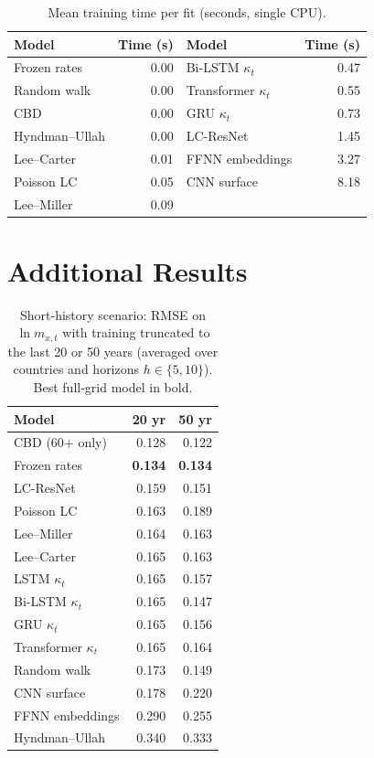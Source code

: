 \documentclass[11pt,a4paper]{article}
\begin{document}
\begin{table}[htbp]
\centering
\caption{Mean training time per fit (seconds, single CPU).}
\label{tab:times}
\small
\begin{tabular}{l r @{\hspace{2.5em}} l r}
\toprule
Model & Time (s) & Model & Time (s) \\
\midrule
Frozen rates   & 0.00 & Bi-LSTM $\kappa_t$     & 0.47 \\
Random walk    & 0.00 & Transformer $\kappa_t$ & 0.55 \\
CBD            & 0.00 & GRU $\kappa_t$         & 0.73 \\
Hyndman--Ullah & 0.00 & LC-ResNet              & 1.45 \\
Lee--Carter    & 0.01 & FFNN embeddings        & 3.27 \\
Poisson LC     & 0.05 & CNN surface            & 8.18 \\
Lee--Miller    & 0.09 & & \\
\bottomrule
\end{tabular}
\end{table}

\section{Additional Results}
\label{app:extra}

\begin{table}[htbp]
\centering
\caption{Short-history scenario: RMSE on $\ln m_{x,t}$ with training truncated to the last 20 or 50 years (averaged over countries and horizons $h \in \{5, 10\}$). Best full-grid model in bold.}
\label{tab:shorthist}
\small
\begin{tabular}{l RR}
\toprule
Model & 20 yr & 50 yr \\
\midrule
CBD (60+ only)     & 0.128 & 0.122 \\
Frozen rates       & \textbf{0.134} & \textbf{0.134} \\
LC-ResNet          & 0.159 & 0.151 \\
Poisson LC         & 0.163 & 0.189 \\
Lee--Miller        & 0.164 & 0.163 \\
Lee--Carter        & 0.165 & 0.163 \\
LSTM $\kappa_t$    & 0.165 & 0.157 \\
Bi-LSTM $\kappa_t$ & 0.165 & 0.147 \\
GRU $\kappa_t$     & 0.165 & 0.156 \\
Transformer $\kappa_t$ & 0.165 & 0.164 \\
Random walk        & 0.173 & 0.149 \\
CNN surface        & 0.178 & 0.220 \\
FFNN embeddings    & 0.290 & 0.255 \\
Hyndman--Ullah     & 0.340 & 0.333 \\
\bottomrule
\end{tabular}
\end{table}
\end{document}
